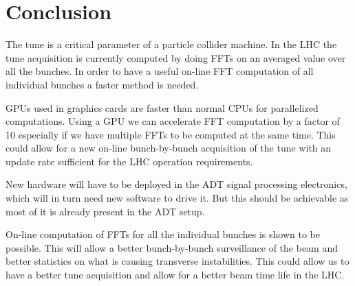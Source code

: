 
\glsresetall
\chapter{Conclusion}

The \gls{tune} is a critical parameter of a particle collider machine. In the \gls{LHC} the \gls{tune} acquisition is currently computed by doing \glspl{FFT} on an averaged value over all the bunches. In order to have a useful on-line \gls{FFT} computation of all individual bunches a faster method is needed. 

\Glspl{GPU} used in graphics cards are faster than normal \glspl{CPU} for parallelized computations. Using a \gls{GPU} we can accelerate \gls{FFT} computation by a factor of 10 especially if we have multiple \glspl{FFT} to be computed at the same time. This could allow for a new on-line bunch-by-bunch acquisition of the \gls{tune} with an update rate sufficient for the LHC operation requirements.

New hardware will have to be deployed in the \gls{ADT} signal processing electronics, which will in turn need new software to drive it. But this should be achievable as most of it is already present in the \gls{ADT} setup.

On-line computation of \glspl{FFT} for all the individual bunches is shown to be possible. This will allow a better bunch-by-bunch surveillance of the beam and better statistics on what is causing transverse instabilities. This could allow us to have a better tune acquisition and allow for a better beam time life in the \gls{LHC}.
